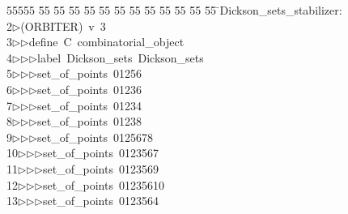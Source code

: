 %
%
\begin{tabbing}
55555 \= 55 \= 55 \= 55 \= 55 \= 55 \= 55 \= 55 \= 55 \= 55 \= 55 \= 55 \= 55 \= \>Dickson\_sets\_stabilizer:\\[0pt]
2\>$\triangleright$\>(ORBITER)\ v\ 3\ \\[0pt]
3\>$\triangleright$\>$\triangleright$\>define\ C\ combinatorial\_object\ \\[0pt]
4\>$\triangleright$\>$\triangleright$\>$\triangleright$\>label\ Dickson\_sets\ Dickson\_sets\ \\[0pt]
5\>$\triangleright$\>$\triangleright$\>$\triangleright$\>set\_of\_points\ 01256\ \\[0pt]
6\>$\triangleright$\>$\triangleright$\>$\triangleright$\>set\_of\_points\ 01236\ \\[0pt]
7\>$\triangleright$\>$\triangleright$\>$\triangleright$\>set\_of\_points\ 01234\ \\[0pt]
8\>$\triangleright$\>$\triangleright$\>$\triangleright$\>set\_of\_points\ 01238\ \\[0pt]
9\>$\triangleright$\>$\triangleright$\>$\triangleright$\>set\_of\_points\ 0125678\ \\[0pt]
10\>$\triangleright$\>$\triangleright$\>$\triangleright$\>set\_of\_points\ 0123567\ \\[0pt]
11\>$\triangleright$\>$\triangleright$\>$\triangleright$\>set\_of\_points\ 0123569\ \\[0pt]
12\>$\triangleright$\>$\triangleright$\>$\triangleright$\>set\_of\_points\ 01235610\ \\[0pt]
13\>$\triangleright$\>$\triangleright$\>$\triangleright$\>set\_of\_points\ 0123564\ \\[0pt]

\end{tabbing}
